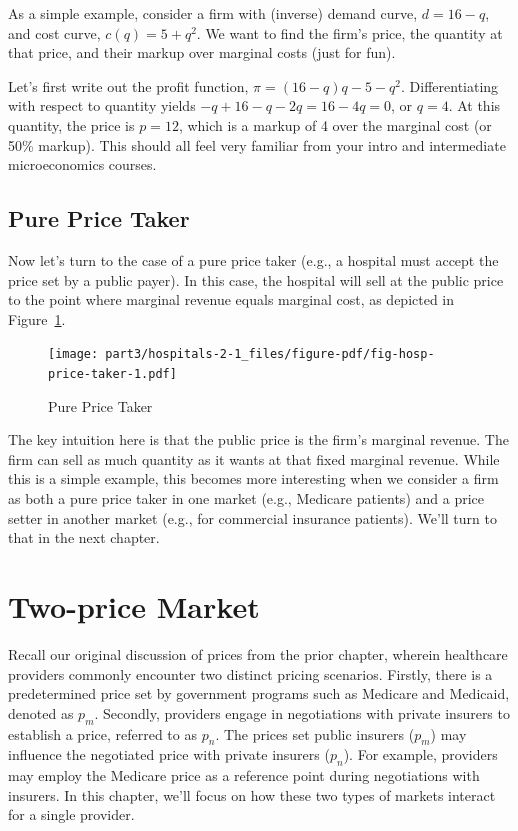 \documentclass[
  letterpaper,
  DIV=11,
  numbers=noendperiod]{scrreport}
\theoremstyle{definition}
\theoremstyle{remark}
\begin{document}
As a simple example, consider a firm with (inverse) demand curve,
\(d=16-q\), and cost curve, \(c(q)=5+q^{2}\). We want to find the firm's
price, the quantity at that price, and their markup over marginal costs
(just for fun).

Let's first write out the profit function,
\(\pi = (16-q)q - 5 - q^{2}\). Differentiating with respect to quantity
yields \(-q + 16 - q - 2q= 16-4q=0\), or \(q=4\). At this quantity, the
price is \(p=12\), which is a markup of 4 over the marginal cost (or
50\% markup). This should all feel very familiar from your intro and
intermediate microeconomics courses.

\hypertarget{pure-price-taker}{%
\section{Pure Price Taker}\label{pure-price-taker}}

Now let's turn to the case of a pure price taker (e.g., a hospital must
accept the price set by a public payer). In this case, the hospital will
sell at the public price to the point where marginal revenue equals
marginal cost, as depicted in Figure~\ref{fig-hosp-price-taker}.

\begin{figure}

{\centering \texttt{[image: part3/hospitals-2-1\_files/figure-pdf/fig-hosp-price-taker-1.pdf]}

}

\caption{\label{fig-hosp-price-taker}Pure Price Taker}

\end{figure}

The key intuition here is that the public price is the firm's marginal
revenue. The firm can sell as much quantity as it wants at that fixed
marginal revenue. While this is a simple example, this becomes more
interesting when we consider a firm as both a pure price taker in one
market (e.g., Medicare patients) and a price setter in another market
(e.g., for commercial insurance patients). We'll turn to that in the
next chapter.

\hypertarget{two-price-market}{%
\chapter{Two-price Market}\label{two-price-market}}

Recall our original discussion of prices from the prior chapter, wherein
healthcare providers commonly encounter two distinct pricing scenarios.
Firstly, there is a predetermined price set by government programs such
as Medicare and Medicaid, denoted as \(p_m\). Secondly, providers engage
in negotiations with private insurers to establish a price, referred to
as \(p_n\). The prices set public insurers (\(p_m\)) may influence the
negotiated price with private insurers (\(p_n\)). For example, providers
may employ the Medicare price as a reference point during negotiations
with insurers. In this chapter, we'll focus on how these two types of
markets interact for a single provider.
\end{document}
